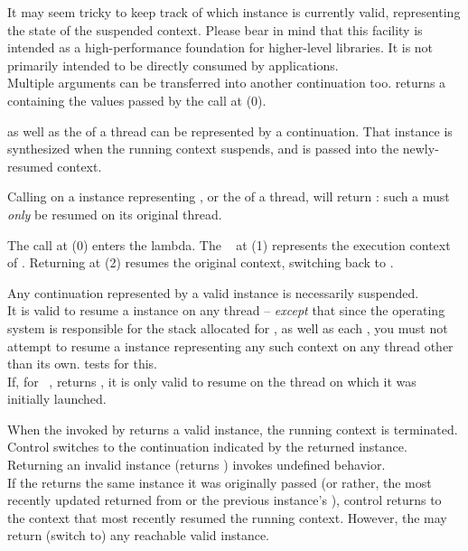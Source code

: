 It may seem tricky to keep track of which \cont instance is currently valid,
representing the state of the suspended context. Please bear in mind that this
facility is intended as a high-performance foundation for higher-level
libraries. It is not primarily intended to be directly consumed by applications.\\

Multiple arguments can be transferred into another continuation too.
 returns a 
containing the values passed by the \callcc call at (0).


\label{subsec:main}

\main as well as the \entryfn of a thread can be represented by a continuation.
That \cont instance is synthesized when the running context suspends, and is
passed into the newly-resumed context.

Calling  on a \cont instance representing \main, or
the \entryfn of a thread, will return : such a \cont
must \emph{only} be resumed on its original thread.

The  call at (0) enters the lambda. The \cont\  at (1)
represents the execution context of \main. Returning  at (2) resumes the
original context, switching back to \main.


Any continuation represented by a valid \cont instance is necessarily suspended.\\
It is valid to resume a \cont instance on any thread -- \emph{except} that
since the operating system is responsible for the stack allocated for \main,
as well as each , you must not attempt to resume a \cont
instance representing any such context on any thread other
than its own.  tests for this.\\
If, for \cont\ ,  returns , it is
only valid to resume  on the thread on which it was initially
launched.


When the \entryfn invoked by \cc returns a valid \cont instance,
the running context is terminated. Control switches to the continuation
indicated by the returned \cont instance.\\
Returning an invalid \cont instance (\opbool returns ) invokes
undefined behavior.\\
If the \entryfn returns the same \cont instance it was originally
passed (or rather, the most recently updated \cont returned from \callcc or the
previous instance's \resume), control returns to the context that most
recently resumed the running context. However, the \entryfn may return (switch
to) any reachable valid \cont instance.\\


